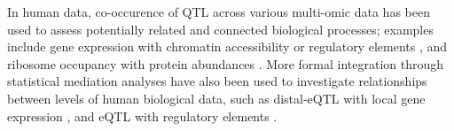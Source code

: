\documentclass[9pt,twocolumn,twoside]{gsajnl}
\begin{document}
In human data, co-occurence of QTL across various multi-omic data has been used to assess potentially related and connected biological processes; examples include gene expression with chromatin accessibility \citep{Degner2012} or regulatory elements \citep{Pai2015},  and ribosome occupancy with protein abundances \citep{Battle2015, Yang2017}.
More formal integration through statistical mediation analyses have also been used to investigate relationships between levels of human biological data, such as distal-eQTL with local gene expression \citep{Battle2014}, and eQTL with regulatory elements \citep{Alasoo2017, Roytman2018, Wu2018}.
\end{document}
